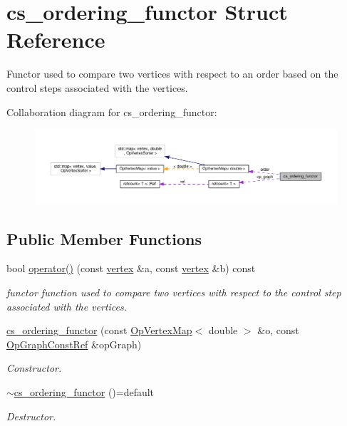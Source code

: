 \hypertarget{structcs__ordering__functor}{}\section{cs\+\_\+ordering\+\_\+functor Struct Reference}
\label{structcs__ordering__functor}


Functor used to compare two vertices with respect to an order based on the control steps associated with the vertices.  




Collaboration diagram for cs\+\_\+ordering\+\_\+functor\+:
\nopagebreak
\begin{figure}[H]
\begin{center}
\leavevmode
\includegraphics[width=350pt]{d8/dac/structcs__ordering__functor__coll__graph}
\end{center}
\end{figure}
\subsection*{Public Member Functions}
\begin{DoxyCompactItemize}
\item 
bool \hyperlink{structcs__ordering__functor_a28ed85c1fa17891458b852ef8cb58f57}{operator()} (const \hyperlink{graph_8hpp_abefdcf0544e601805af44eca032cca14}{vertex} \&a, const \hyperlink{graph_8hpp_abefdcf0544e601805af44eca032cca14}{vertex} \&b) const
\begin{DoxyCompactList}\small\item\em functor function used to compare two vertices with respect to the control step associated with the vertices. \end{DoxyCompactList}\item 
\hyperlink{structcs__ordering__functor_a013a079f45948b182ae82cb82e84d379}{cs\+\_\+ordering\+\_\+functor} (const \hyperlink{classOpVertexMap}{Op\+Vertex\+Map}$<$ double $>$ \&o, const \hyperlink{op__graph_8hpp_a9a0b240622c47584bee6951a6f5de746}{Op\+Graph\+Const\+Ref} \&op\+Graph)
\begin{DoxyCompactList}\small\item\em Constructor. \end{DoxyCompactList}\item 
\hyperlink{structcs__ordering__functor_ab9690bb40e4779bd321d16ecc468c07d}{$\sim$cs\+\_\+ordering\+\_\+functor} ()=default
\begin{DoxyCompactList}\small\item\em Destructor. \end{DoxyCompactList}\end{DoxyCompactItemize}
